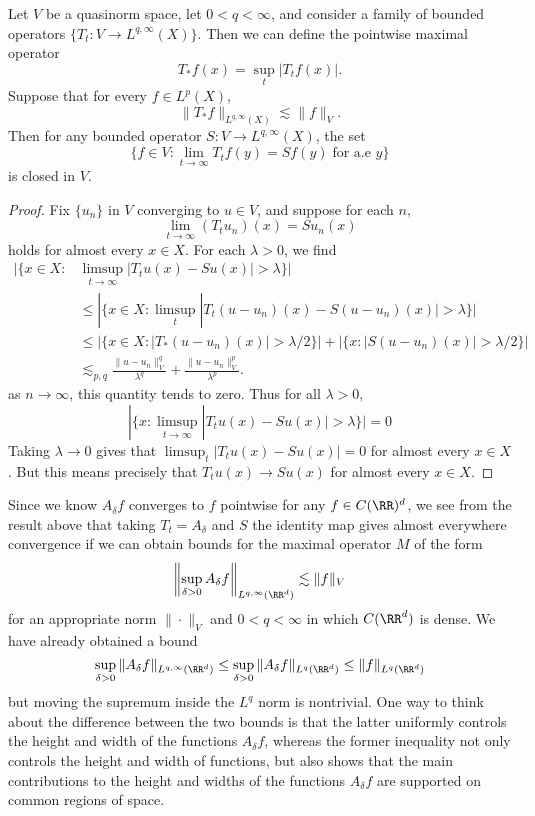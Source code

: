 \begin{theorem}
  Let $V$ be a quasinorm space, let $0 < q < \infty$, and consider a family of bounded operators $\{ T_t: V \to L^{q,\infty}(X) \}$. Then we can define the pointwise maximal operator
  \[ T_* f(x) = \sup_t |T_t f(x)|. \]
  Suppose that for every $f \in L^p(X)$,
  \[ \| T_* f \|_{L^{q,\infty}(X)} \lesssim \| f \|_V. \]
  Then for any bounded operator $S: V \to L^{q,\infty}(X)$, the set
  \[ \{ f \in V : \lim_{t \to \infty} T_t f(y) = Sf(y)\; \text{for a.e $y$} \} \]
  is closed in $V$.
\end{theorem}
\begin{proof}
  Fix $\{ u_n \}$ in $V$ converging to $u \in V$, and suppose for each $n$,
  \[ \lim_{t \to \infty} (T_t u_n)(x) = Su_n(x) \]
  holds for almost every $x \in X$. For each $\lambda > 0$, we find
  \begin{align*}
    |\{ x \in X: &\limsup_{t \to \infty} |T_t u(x) - Su(x)| > \lambda \}|\\
    &\leq |\{ x \in X: \limsup_t |T_t(u - u_n)(x) - S(u - u_n)(x)| > \lambda \}|\\
    &\leq |\{ x \in X : |T_*(u - u_n)(x)| > \lambda/2 \}| + | \{ x: |S(u - u_n)(x)| > \lambda/2 \} |\\
    &\lesssim_{p,q} \frac{\| u - u_n \|_V^q}{\lambda^q} + \frac{\| u - u_n \|_V^p}{\lambda^p}.
  \end{align*}
  as $n \to \infty$, this quantity tends to zero. Thus for all $\lambda > 0$,
  \[ |\{ x: \limsup_{t \to \infty} |T_t u(x) - Su(x)| > \lambda \}| = 0 \]
  Taking $\lambda \to 0$ gives that $\limsup_t |T_t u(x) - Su(x)| = 0$ for almost every $x \in X$. But this means precisely that $T_tu(x) \to Su(x)$ for almost every $x \in X$.
\end{proof}

Since we know $A_\delta f$ converges to $f$ pointwise for any $f \in C(\RR)^d$, we see from the result above that taking $T_t = A_\delta$ and $S$ the identity map gives almost everywhere convergence if we can obtain bounds for the maximal operator $M$ of the form
%
\[ \left\| \sup_{\delta > 0} A_\delta f \right\|_{L^{q,\infty}(\RR^d)} \lesssim \| f \|_V \]
%
for an appropriate norm $\| \cdot \|_V$ and $0 < q < \infty$ in which $C(\RR^d)$ is dense. We have already obtained a bound
%
\[ \sup_{\delta > 0} \| A_\delta f \|_{L^{q,\infty}(\RR^d)} \leq \sup_{\delta > 0} \| A_\delta f \|_{L^q(\RR^d)} \leq \| f \|_{L^q(\RR^d)} \]
%
but moving the supremum inside the $L^q$ norm is nontrivial. One way to think about the difference between the two bounds is that the latter uniformly controls the height and width of the functions $A_\delta f$, whereas the former inequality not only controls the height and width of functions, but also shows that the main contributions to the height and widths of the functions $A_\delta f$ are supported on common regions of space.

